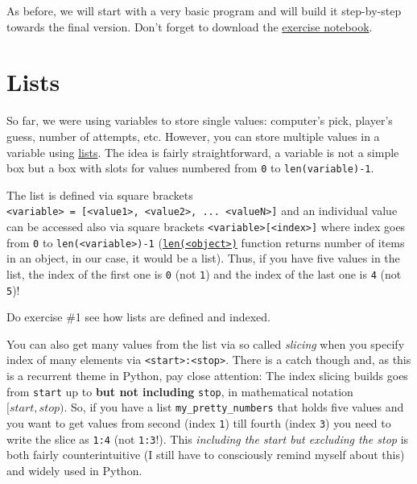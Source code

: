 \documentclass[
]{book}
\begin{document}
As before, we will start with a very basic program and will build it step-by-step towards the final version. Don't forget to download the \href{notebooks/Seminar\%2004.\%20Hunt\%20the\%20Wumpus,\%20part\%201.ipynb}{exercise notebook}.

\hypertarget{lists}{%
\section{Lists}\label{lists}}

So far, we were using variables to store single values: computer's pick, player's guess, number of attempts, etc. However, you can store multiple values in a variable using \href{https://docs.python.org/3/library/stdtypes.html\#list}{lists}. The idea is fairly straightforward, a variable is not a simple box but a box with slots for values numbered from \texttt{0} to \texttt{len(variable)-1}.

The list is defined via square brackets \texttt{\textless{}variable\textgreater{}\ =\ {[}\textless{}value1\textgreater{},\ \textless{}value2\textgreater{},\ ...\ \textless{}valueN\textgreater{}{]}} and an individual value can be accessed also via square brackets \texttt{\textless{}variable\textgreater{}{[}\textless{}index\textgreater{}{]}} where index goes from \texttt{0} to \texttt{len(\textless{}variable\textgreater{})-1} (\href{https://docs.python.org/3/library/functions.html\#len}{\texttt{len(\textless{}object\textgreater{})}} function returns number of items in an object, in our case, it would be a list). Thus, if you have five values in the list, the index of the first one is \texttt{0} (not \texttt{1}) and the index of the last one is \texttt{4} (not \texttt{5})!

Do exercise \#1 see how lists are defined and indexed.

You can also get many values from the list via so called \emph{slicing} when you specify index of many elements via \texttt{\textless{}start\textgreater{}:\textless{}stop\textgreater{}}. There is a catch though and, as this is a recurrent theme in Python, pay close attention: The index slicing builds goes from \texttt{start} up to \textbf{but not including} \texttt{stop}, in mathematical notation \([start, stop)\). So, if you have a list \texttt{my\_pretty\_numbers} that holds five values and you want to get values from second (index \texttt{1}) till fourth (index \texttt{3}) you need to write the slice as \texttt{1:4} (not \texttt{1:3}!). This \emph{including the start but excluding the stop} is both fairly counterintuitive (I still have to consciously remind myself about this) and widely used in Python.
\end{document}
